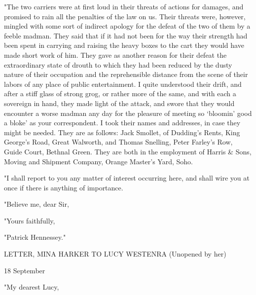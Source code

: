 "The two carriers were at first loud in their threats of actions for damages, and promised to rain all the penalties of the law on us. Their threats were, however, mingled with some sort of indirect apology for the defeat of the two of them by a feeble madman. They said that if it had not been for the way their strength had been spent in carrying and raising the heavy boxes to the cart they would have made short work of him. They gave as another reason for their defeat the extraordinary state of drouth to which they had been reduced by the dusty nature of their occupation and the reprehensible distance from the scene of their labors of any place of public entertainment. I quite understood their drift, and after a stiff glass of strong grog, or rather more of the same, and with each a sovereign in hand, they made light of the attack, and swore that they would encounter a worse madman any day for the pleasure of meeting so `bloomin' good a bloke' as your correspondent. I took their names and addresses, in case they might be needed. They are as follows: Jack Smollet, of Dudding's Rents, King George's Road, Great Walworth, and Thomas Snelling, Peter Farley's Row, Guide Court, Bethnal Green. They are both in the employment of Harris & Sons, Moving and Shipment Company, Orange Master's Yard, Soho. 

"I shall report to you any matter of interest occurring here, and shall wire you at once if there is anything of importance. 

"Believe me, dear Sir, 

"Yours faithfully, 

"Patrick Hennessey." 

LETTER, MINA HARKER TO LUCY WESTENRA (Unopened by her) 

18 September 

"My dearest Lucy, 

